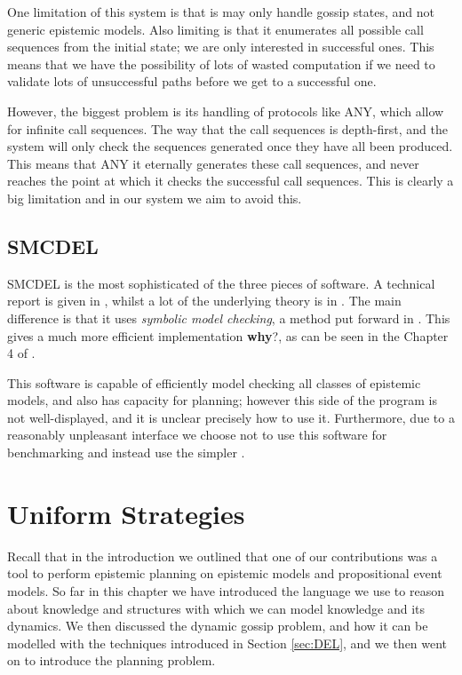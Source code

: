 \documentclass[10pt, a4paper]{report}
\begin{document}
One limitation of this system is that is may only handle gossip states, and not
generic epistemic models. Also limiting is that it enumerates all possible call
sequences from the initial state; we are only interested in successful ones.
This means that we have the possibility of lots of wasted computation if we need
to validate lots of unsuccessful paths before we get to a successful one.

However, the biggest problem is its handling of protocols like \textsf{ANY},
which allow for infinite call sequences. The way that the call sequences is
depth-first, and the system will only check the sequences generated once they
have all been produced. This means that \textsf{ANY} it eternally generates
these call sequences, and never reaches the point at which it checks the
successful call sequences. This is clearly a big limitation and in our system we
aim to avoid this. 

\subsection{SMCDEL}

SMCDEL is the most sophisticated of the three pieces of software. A technical
report is given in \cite{SMCDEL}, whilst a lot of the underlying theory is in
\cite{MalvinThesis}. The main difference is that it uses \emph{symbolic model
  checking}, a method put forward in \cite{SymbolicModelChecking}. This gives a
much more efficient implementation \textbf{why}?, as can be seen in the
Chapter 4 of \cite{MalvinThesis}.

This software is capable of efficiently model checking all classes of epistemic
models, and also has capacity for planning; however this side of the program is
not well-displayed, and it is unclear precisely how to use it. Furthermore, due
to a reasonably unpleasant interface we choose not to use this software for
benchmarking and instead use the simpler \cite{GithubGossip}. 


\section{Uniform Strategies}
\label{sec:UniformStrategies}

Recall that in the introduction we outlined that one of our contributions was a
tool to perform epistemic planning on epistemic models and propositional event
models. So far in this chapter we have introduced the language we use to reason
about knowledge and structures with which we can model knowledge and its
dynamics. We then discussed the dynamic gossip problem, and how it can be
modelled with the techniques introduced in Section \ref{sec:DEL}, and we then
went on to introduce the planning problem. 
\end{document}
